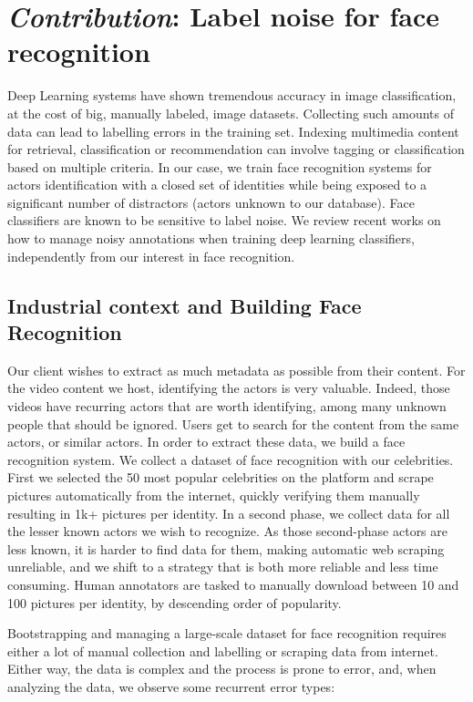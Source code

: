 \chapter{\emph{\arr Contribution}: Label noise for face recognition}

Deep Learning systems have shown tremendous accuracy in image classification, at the cost of big, manually labeled, image datasets. Collecting such amounts of data can lead to labelling errors in the training set. Indexing multimedia content for retrieval, classification or recommendation can involve tagging or classification based on multiple criteria. In our case, we train face recognition systems for actors identification with a closed set of identities while being exposed to a significant number of distractors (actors unknown to our database). Face classifiers are known to be sensitive to label noise. We review recent works on how to manage noisy annotations when training deep learning classifiers, independently from our interest in face recognition.

\section{Industrial context and Building Face Recognition}

Our client wishes to extract as much metadata as possible from their content. For the video content we host, identifying the actors is very valuable. Indeed, those videos have recurring actors that are worth identifying, among many unknown people that should be ignored. Users get to search for the content from the same actors, or similar actors. In order to extract these data, we build a face recognition system. We collect a dataset of face recognition with our celebrities. First we selected the 50 most popular celebrities on the platform and scrape pictures automatically from the internet, quickly verifying them manually resulting in 1k+ pictures per identity. In a second phase, we collect data for all the lesser known actors we wish to recognize. As those second-phase actors are less known, it is harder to find data for them, making automatic web scraping unreliable, and we shift to a strategy that is both more reliable and less time consuming. Human annotators are tasked to manually download between 10 and 100 pictures per identity, by descending order of popularity.

Bootstrapping and managing a large-scale dataset for face recognition requires either a lot of manual collection and labelling or scraping data from internet. Either way, the data is complex and the process is prone to error, and, when analyzing the data, we observe some recurrent error types:

